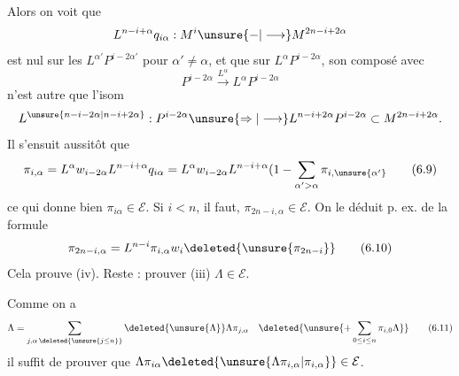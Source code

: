Alors on voit que
\[
L^{n-i+\alpha}q_{i\alpha}:M^i\unsure{-|\longrightarrow}M^{2n-i+2\alpha}
\]
est nul sur les $L^{\alpha'}P^{i-2\alpha'}$ pour $\alpha'\neq\alpha$, et que sur $L^\alpha P^{i-2\alpha}$,  son composé avec
\[
P^{i-2\alpha}\xrightarrow{L^\alpha}L^\alpha P^{i-2\alpha}
\]
n'est autre que l'isom
\[
L^{\unsure{n-i-2\alpha|n-i+2\alpha}}:P^{i-2\alpha}\unsure{\Rightarrow|\longrightarrow}L^{n-i+2\alpha}P^{i-2\alpha}\subset M^{2n-i+2\alpha}.
\]
Il s'ensuit aussitôt que
\[
\pi_{i,\alpha}=L^\alpha w_{i-2\alpha}L^{n-i+\alpha}q_{i\alpha}=L^\alpha w_{i-2\alpha}L^{n-i+\alpha}(1-\sum_{\alpha'>\alpha}\pi_{i,\unsure{\alpha'}}
\tag{6.9}
\]
ce qui donne bien $\pi_{i\alpha}\in\mathcal E$. 
Si $i<n$, il faut,  $\pi_{2n-i,\alpha}\in\mathcal E$. On
le déduit p. ex. de la formule
\[
\pi_{2n-i,\alpha}=L^{n-i}\pi_{i,\alpha}w_i\deleted{\unsure{\pi_{2n-i}}}
\tag{6.10}
\]
Cela prouve  (iv). Reste : prouver (iii) $\Lambda\in\mathcal E$.

Comme on a
\[
\Lambda=\sum_{j,\alpha\,\deleted{\unsure{j\leq n}}}\deleted{\unsure{\Lambda}}\Lambda\pi_{j,\alpha}\quad\deleted{\unsure{+\sum_{0\leq i\leq n}\pi_{i,0}\Lambda}}
\tag{6.11}
\]
il suffit de prouver que $\Lambda\pi_{i\alpha}\deleted{\unsure{\Lambda\pi_{i,\alpha}|\pi_{i,\alpha}}}\in\mathcal E$.
